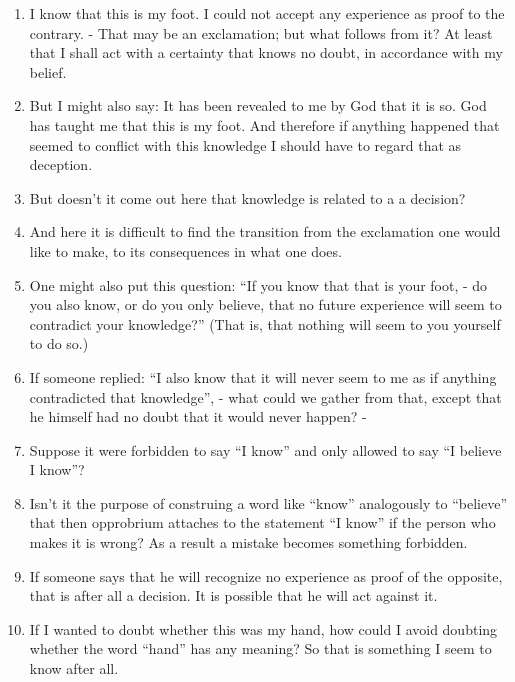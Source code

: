 \documentclass{book}
\begin{document}
\begin{enumerate}
\item
I know that this is my foot. I could not accept any experience as proof to the
contrary. - That may be an exclamation; but what follows from it? At least that
I shall act with a certainty that knows no doubt, in accordance with my belief.

\item
But I might also say: It has been revealed to me by God that it is so. God has
taught me that this is my foot. And therefore if anything happened that seemed
to conflict with this knowledge I should have to regard that as deception.

\item
But doesn't it come out here that knowledge is related to a a decision?

\item
And here it is difficult to find the transition from the exclamation one would
like to make, to its consequences in what one does.

\item
One might also put this question: ``If you know that that is your foot, - do
you also know, or do you only believe, that no future experience will seem to
contradict your knowledge?'' (That is, that nothing will seem to you yourself
to do so.)

\item
If someone replied: ``I also know that it will never seem to me as if anything
contradicted that knowledge'', - what could we gather from that, except that he
himself had no doubt that it would never happen? -

\item
Suppose it were forbidden to say ``I know'' and only allowed to say ``I believe
I know''?

\item
Isn't it the purpose of construing a word like ``know'' analogously to
``believe'' that then opprobrium attaches to the statement ``I know'' if the
person who makes it is wrong?  As a result a mistake becomes something
forbidden.

\item
If someone says that he will recognize no experience as proof of the opposite,
that is after all a decision. It is possible that he will act against it.

\item
If I wanted to doubt whether this was my hand, how could I avoid doubting
whether the word ``hand'' has any meaning? So that is something I seem to know
after all.


\end{enumerate}
\end{document}
